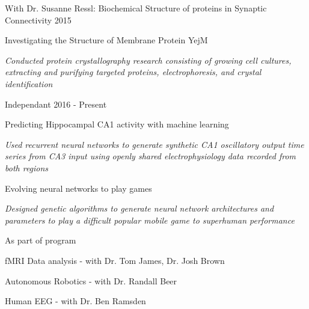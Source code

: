 \begin{cventries}
\cvrpentry
    {With Dr. Susanne Ressl: Biochemical Structure of proteins in Synaptic Connectivity} %
    {} %
    {} %
    {2015} %
    {
      \begin{cvrpitems} %
        \item {Investigating the Structure of Membrane Protein YejM}
            \begin{cvitemsdes} 
	     \item{\textit{Conducted protein crystallography research consisting of growing cell cultures, extracting and purifying targeted proteins, electrophoresis, and crystal identification}}
           \end{cvitemsdes} 
      \end{cvrpitems}
    }

\cvrpentry
    {Independant} %
    {} %
    {} %
    {2016 - Present} %
    {
      \begin{cvrpitems} %
        \item {Predicting Hippocampal CA1 activity with machine learning}
            \begin{cvitemsdes} 
	     \item{\textit{Used recurrent neural networks to generate synthetic CA1 oscillatory output time series from CA3 input using openly shared electrophysiology data recorded from both regions}}
           \end{cvitemsdes} 
	\item {Evolving neural networks to play games}
            \begin{cvitemsdes} 
	     \item{\textit{Designed genetic algorithms to generate neural network architectures and parameters to play a difficult popular mobile game to superhuman performance}}
           \end{cvitemsdes} 
      \end{cvrpitems}
    }

\cvrpentry
    {As part of program} %
    {} %
    {} %
    {} %
    {
      \begin{cvrpitems} %
        \item {fMRI Data analysis - with Dr. Tom James, Dr. Josh Brown}
	\item {Autonomous Robotics - with Dr. Randall Beer}
	\item{Human EEG - with Dr. Ben Ramsden }
      \end{cvrpitems}
    }




\end{cventries}
